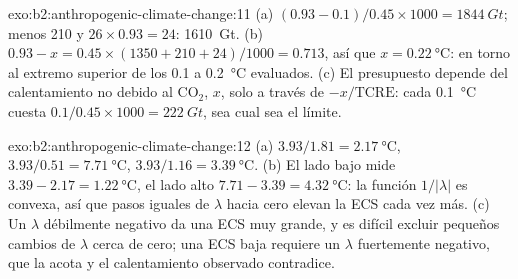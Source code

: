 \begin{solution}{exo:b2:anthropogenic-climate-change:11}
(a) $(0.93 - 0.1)/0.45 \times 1000 = \qty{1844}{Gt}$; menos 210 y $26 \times 0.93 = 24$:
\qty{1610}{Gt}. (b) $0.93 - x = 0.45 \times (1350 + 210 + 24)/1000 = 0.713$, así que $x =
\qty{0.22}{\celsius}$: en torno al extremo superior de los 0.1 a \qty{0.2}{\celsius} evaluados. (c) El
presupuesto depende del calentamiento no debido al CO$_2$, $x$, solo a través de $-x/\text{TCRE}$: cada
\qty{0.1}{\celsius} cuesta $0.1/0.45 \times 1000 = \qty{222}{Gt}$, sea cual sea el límite.
\end{solution}

\begin{solution}{exo:b2:anthropogenic-climate-change:12}
(a) $3.93/1.81 = \qty{2.17}{\celsius}$, $3.93/0.51 = \qty{7.71}{\celsius}$, $3.93/1.16 =
\qty{3.39}{\celsius}$. (b) El lado bajo mide $3.39 - 2.17 = \qty{1.22}{\celsius}$, el lado alto
$7.71 - 3.39 = \qty{4.32}{\celsius}$: la función $1/|\lambda|$ es convexa, así que pasos iguales de
$\lambda$ hacia cero elevan la ECS cada vez más. (c) Un $\lambda$ débilmente negativo da una ECS muy
grande, y es difícil excluir pequeños cambios de $\lambda$ cerca de cero; una ECS baja requiere un $\lambda$ fuertemente
negativo, que la  acota y el calentamiento observado contradice.
\end{solution}

